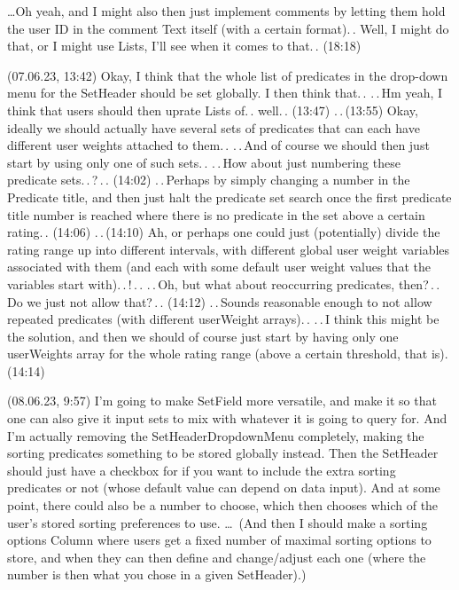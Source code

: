 \documentclass{report}
\begin{document}
\ldots Oh yeah, and I might also then just implement comments by letting them hold the user ID in the comment Text itself (with a certain format).\,. Well, I might do that, or I might use Lists, I'll see when it comes to that.\,. (18:18)

(07.06.23, 13:42) Okay, I think that the whole list of predicates in the drop-down menu for the SetHeader should be set globally. I then think that.\,. .\,.\,Hm yeah, I think that users should then uprate Lists of.\,. well.\,. (13:47) .\,.\,(13:55) Okay, ideally we should actually have several sets of predicates that can each have different user weights attached to them.\,. .\,.\,And of course we should then just start by using only one of such sets.\,. .\,.\,How about just numbering these predicate sets.\,.\,?\,.\,. (14:02) .\,.\,Perhaps by simply changing a number in the Predicate title, and then just halt the predicate set search once the first predicate title number is reached where there is no predicate in the set above a certain rating.\,. (14:06) .\,.\,(14:10) Ah, or perhaps one could just (potentially) divide the rating range up into different intervals, with different global user weight variables associated with them (and each with some default user weight values that the variables start with).\,.\,!\,.\,. .\,.\,Oh, but what about reoccurring predicates, then?\,.\,. Do we just not allow that?\,.\,. (14:12) .\,.\,Sounds reasonable enough to not allow repeated predicates (with different userWeight arrays).\,. .\,.\,I think this might be the solution, and then we should of course just start by having only one userWeights array for the whole rating range (above a certain threshold, that is). (14:14)

(08.06.23, 9:57) I'm going to make SetField more versatile, and make it so that one can also give it input sets to mix with whatever it is going to query for. And I'm actually removing the SetHeaderDropdownMenu completely, making the sorting predicates something to be stored globally instead. Then the SetHeader should just have a checkbox for if you want to include the extra sorting predicates or not (whose default value can depend on data input). And at some point, there could also be a number to choose, which then chooses which of the user's stored sorting preferences to use. \ldots\ (And then I should make a sorting options Column where users get a fixed number of maximal sorting options to store, and when they can then define and change/adjust each one (where the number is then what you chose in a given SetHeader).)
\end{document}
